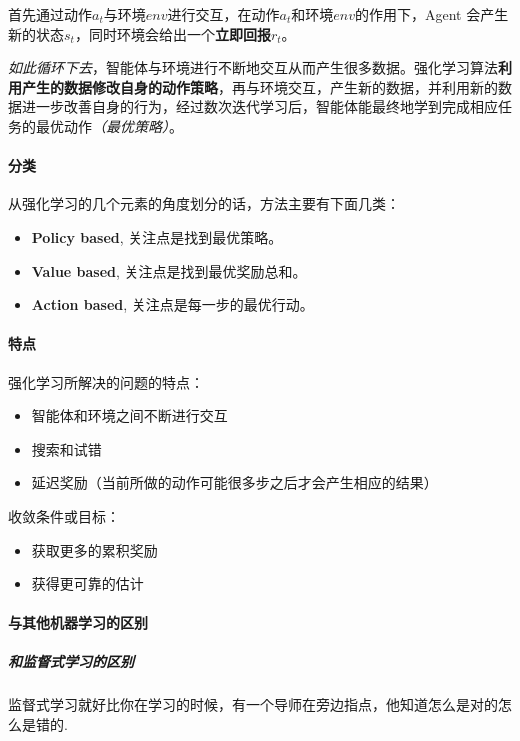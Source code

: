 \documentclass[UTF8,a4paper,12pt]{ctexbook}
\begin{document}
				首先通过动作$a_t$与环境$env$进行交互，在动作$a_t$和环境$env$的作用下，Agent 会产生新的状态$s_t$，同时环境会给出一个\textbf{立即回报}$r_t$。
				
				\textit{如此循环下去}，智能体与环境进行不断地交互从而产生很多数据。强化学习算法\textbf{利用产生的数据修改自身的动作策略}，再与环境交互，产生新的数据，并利用新的数据进一步改善自身的行为，经过数次迭代学习后，智能体能最终地学到完成相应任务的最优动作\textit{（最优策略）}。
				
			\paragraph{分类}
				从强化学习的几个元素的角度划分的话，方法主要有下面几类：
				
				\begin{itemize}
					\item \textbf{Policy based}, 关注点是找到最优策略。
					\item \textbf{Value based}, 关注点是找到最优奖励总和。
					\item \textbf{Action based}, 关注点是每一步的最优行动。
				\end{itemize}
			
			
			\paragraph{特点}
				强化学习所解决的问题的特点：
				\begin{itemize}[itemindent = 1em]
					\item 智能体和环境之间不断进行交互
					\item 搜索和试错
					\item 延迟奖励（当前所做的动作可能很多步之后才会产生相应的结果）
				\end{itemize}
			
				收敛条件或目标：
				\begin{itemize}[itemindent = 1em]
					\item 获取更多的累积奖励
					\item 获得更可靠的估计
				\end{itemize}
			
			
			\paragraph{与其他机器学习的区别}
				\subparagraph{和监督式学习的区别}
					监督式学习就好比你在学习的时候，有一个导师在旁边指点，他知道怎么是对的怎么是错的.
					
\end{document}
